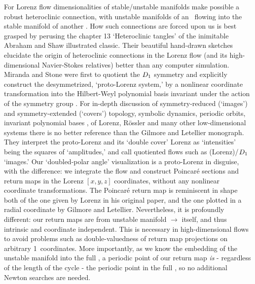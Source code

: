For Lorenz flow
dimensionalities of stable/unstable manifolds
make possible a
robust heteroclinic connection,
with unstable manifolds of an \eqv\ flowing into the
stable manifold of another \eqva.
How such connections are forced upon us is
best grasped by perusing the chapter 13 `Heteroclinic tangles'
of the inimitable
Abraham and Shaw illustrated classic.
Their beautiful hand-drawn sketches elucidate the origin
of heteroclinic connections in the Lorenz flow (and its high-dimensional
Navier-Stokes relatives) better than any computer simulation.
Miranda and Stone were first to
quotient the $D_1$ symmetry and explicitly construct
the desymmetrized, `proto-Lorenz system,'
by a nonlinear coordinate transformation into the Hilbert-Weyl
polynomial basis
invariant under the action of the symmetry group%
.
For in-depth discussion of symmetry-reduced (`images')
and symmetry-extended (`covers')
topology, symbolic dynamics, periodic orbits,
invariant polynomial bases \etc, of
Lorenz, R\"ossler and many other low-dimensional systems
there is
no better reference than the
Gilmore and Letellier monograph.
%
They interpret the proto-Lorenz and its `double
cover' Lorenz as `intensities' being
the squares of `amplitudes,' and call quotiented
flows such as (Lorenz)/$D_1$ `images.'
Our `doubled-polar angle' visualization
is a proto-Lorenz in disguise, with the difference: we
integrate the flow and construct Poincar\'e sections and
return maps in the Lorenz $[x,y,z]$ coordinates, without
any nonlinear coordinate transformations.
The Poincar\'e
return map  is reminiscent
in shape both of the one given by Lorenz
in his original paper, and the one plotted in
a radial coordinate by Gilmore and Letellier.
Nevertheless, it is profoundly different:
our return maps are
from unstable manifold $\to$ itself,
and thus intrinsic and coordinate independent. This is necessary
in high-dimensional flows
to avoid problems such as double-valuedness of return map projections
on arbitrary 1\dmn\ coordinates. More importantly, as we know the embedding
of the unstable manifold into the full \statesp, a periodic point
of our return map \emph{is} - regardless of the
length of the cycle -  the periodic point in the full  \statesp,
so no additional Newton searches are needed.

